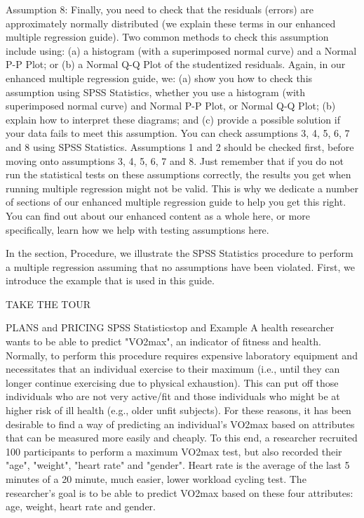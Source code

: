 \documentclass[]{article}
\begin{document}
	Assumption 8: Finally, you need to check that the residuals (errors) are approximately normally distributed (we explain these terms in our enhanced multiple regression guide). Two common methods to check this assumption include using: (a) a histogram (with a superimposed normal curve) and a Normal P-P Plot; or (b) a Normal Q-Q Plot of the studentized residuals. Again, in our enhanced multiple regression guide, we: (a) show you how to check this assumption using SPSS Statistics, whether you use a histogram (with superimposed normal curve) and Normal P-P Plot, or Normal Q-Q Plot; (b) explain how to interpret these diagrams; and (c) provide a possible solution if your data fails to meet this assumption.
	You can check assumptions 3, 4, 5, 6, 7 and 8 using SPSS Statistics. Assumptions 1 and 2 should be checked first, before moving onto assumptions 3, 4, 5, 6, 7 and 8. Just remember that if you do not run the statistical tests on these assumptions correctly, the results you get when running multiple regression might not be valid. This is why we dedicate a number of sections of our enhanced multiple regression guide to help you get this right. You can find out about our enhanced content as a whole here, or more specifically, learn how we help with testing assumptions here.
	
	In the section, Procedure, we illustrate the SPSS Statistics procedure to perform a multiple regression assuming that no assumptions have been violated. First, we introduce the example that is used in this guide.
	
	TAKE THE TOUR
	
	PLANS and PRICING
	SPSS Statisticstop and
	Example
	A health researcher wants to be able to predict "VO2max", an indicator of fitness and health. Normally, to perform this procedure requires expensive laboratory equipment and necessitates that an individual exercise to their maximum (i.e., until they can longer continue exercising due to physical exhaustion). This can put off those individuals who are not very active/fit and those individuals who might be at higher risk of ill health (e.g., older unfit subjects). For these reasons, it has been desirable to find a way of predicting an individual's VO2max based on attributes that can be measured more easily and cheaply. To this end, a researcher recruited 100 participants to perform a maximum VO2max test, but also recorded their "age", "weight", "heart rate" and "gender". Heart rate is the average of the last 5 minutes of a 20 minute, much easier, lower workload cycling test. The researcher's goal is to be able to predict VO2max based on these four attributes: age, weight, heart rate and gender.
	
\end{document}
